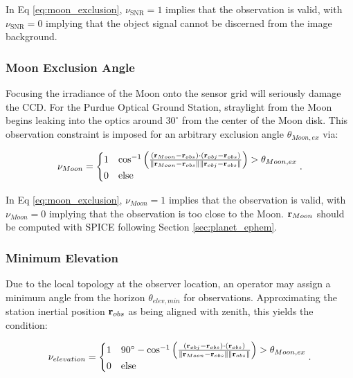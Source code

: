 In Eq \ref{eq:moon_exclusion}, $\nu_{\mathrm{SNR}} = 1$ implies that the observation is valid, with $\nu_{\mathrm{SNR}} = 0$ implying that the object signal cannot be discerned from the image background.

\subsubsection{Moon Exclusion Angle}

Focusing the irradiance of the Moon onto the sensor grid will seriously damage the CCD. For the Purdue Optical Ground Station, straylight from the Moon begins leaking into the optics around $30^\circ$ from the center of the Moon disk. This observation constraint is imposed for an arbitrary exclusion angle $\theta_{Moon,ex}$ via:

\begin{equation} \label{eq:moon_exclusion}
  \nu_{Moon} = \begin{cases}
    1 & \cos^{-1}\left( \frac{\left( \mathbf{r}_{Moon} - \mathbf{r}_{obs} \right) \cdot \left( \mathbf{r}_{obj} - \mathbf{r}_{obs} \right)}{\| \mathbf{r}_{Moon} - \mathbf{r}_{obs} \| \| \mathbf{r}_{obj} - \mathbf{r}_{obs} \|} \right) > \theta_{Moon,ex}\\
    0 & \mathrm{else}
  \end{cases}.
\end{equation}

In Eq \ref{eq:moon_exclusion}, $\nu_{Moon} = 1$ implies that the observation is valid, with $\nu_{Moon} = 0$ implying that the observation is too close to the Moon. $\mathbf{r}_{Moon}$ should be computed with SPICE following Section \ref{sec:planet_ephem}.

\subsubsection{Minimum Elevation}

Due to the local topology at the observer location, an operator may assign a minimum angle from the horizon $\theta_{elev,min}$ for observations. Approximating the station inertial position $\mathbf{r}_{obs}$ as being aligned with zenith, this yields the condition:


\begin{equation} \label{eq:elevation_exclusion}
  \nu_{elevation} = \begin{cases}
    1 & 90^\circ - \cos^{-1}\left( \frac{\left( \mathbf{r}_{obj} - \mathbf{r}_{obs} \right) \cdot \left( \mathbf{r}_{obs} \right)}{\| \mathbf{r}_{Moon} - \mathbf{r}_{obs} \| \| \mathbf{r}_{obs} \|} \right) > \theta_{Moon,ex}\\
    0 & \mathrm{else}
  \end{cases}.
\end{equation}

